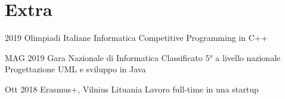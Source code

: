 \documentclass{tccv}
\begin{document}

\section{Extra}

\begin{yearlist}

\item[]{2019}
     {Olimpiadi Italiane Informatica}
     {Competitive Programming in C++}

\item[]{MAG 2019}
     {Gara Nazionale di Informatica}
     {Classificato 5° a livello nazionale \newline
     Progettazione UML e sviluppo in Java}

\item[]{Ott 2018}
     {Erasmus+, Vilnius Lituania}
     {Lavoro full-time in una startup}

\end{yearlist}
\end{document}
